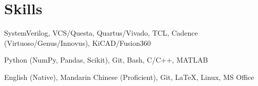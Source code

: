 \section{Skills}

\begin{onecolentry}
    \begin{highlights}
        \item SystemVerilog, VCS/Questa, Quartus/Vivado, TCL, Cadence (Virtuoso/Genus/Innovus), KiCAD/Fusion360
        \item Python (NumPy, Pandas, Scikit), Git, Bash, C/C++, MATLAB
        \item English (Native), Mandarin Chinese (Proficient), Git, LaTeX, Linux, MS Office
    \end{highlights}
\end{onecolentry}
